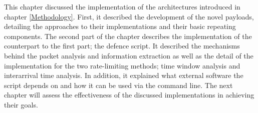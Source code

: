 This chapter discussed the implementation of the architectures introduced in chapter \ref{Methodology}. First, it described the development of the novel payloads, detailing the approaches to their implementations and their basic repeating components. The second part of the chapter describes the implementation of the counterpart to the first part; the defence script. It described the mechanisms behind the packet analysis and information extraction as well as the detail of the implementation for the two rate-limiting methods; time window analysis and interarrival time analysis. In addition, it explained what external software the script depends on and how it can be used via the command line. The next chapter will assess the effectiveness of the discussed implementations in achieving their goals.   

